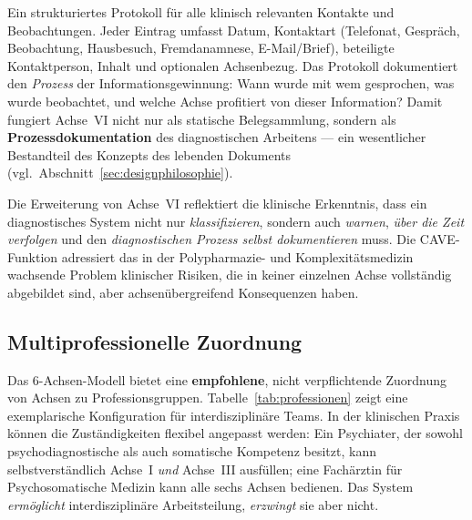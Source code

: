 \documentclass[11pt,a4paper]{article}
\begin{document}
\begin{description}[style=nextline, leftmargin=1.5cm, font=\bfseries]
\item[Kontakt- und Beobachtungsprotokoll] Ein strukturiertes Protokoll f\"ur alle klinisch relevanten Kontakte und Beobachtungen. Jeder Eintrag umfasst Datum, Kontaktart (Telefonat, Gespr\"ach, Beobachtung, Hausbesuch, Fremdanamnese, E-Mail/Brief), beteiligte Kontaktperson, Inhalt und optionalen Achsenbezug. Das Protokoll dokumentiert den \textit{Prozess} der Informationsgewinnung: Wann wurde mit wem gesprochen, was wurde beobachtet, und welche Achse profitiert von dieser Information? Damit fungiert Achse~VI nicht nur als statische Belegsammlung, sondern als \textbf{Prozessdokumentation} des diagnostischen Arbeitens --- ein wesentlicher Bestandteil des Konzepts des lebenden Dokuments (vgl.\ Abschnitt~\ref{sec:designphilosophie}).
\end{description}

Die Erweiterung von Achse~VI reflektiert die klinische Erkenntnis, dass ein diagnostisches System nicht nur \textit{klassifizieren}, sondern auch \textit{warnen}, \textit{\"uber die Zeit verfolgen} und den \textit{diagnostischen Prozess selbst dokumentieren} muss. Die CAVE-Funktion adressiert das in der Polypharmazie- und Komplexit\"atsmedizin wachsende Problem klinischer Risiken, die in keiner einzelnen Achse vollst\"andig abgebildet sind, aber achsen\"ubergreifend Konsequenzen haben.

\subsection{Multiprofessionelle Zuordnung}
\label{sec:multiprofessionell}

Das 6-Achsen-Modell bietet eine \textbf{empfohlene}, nicht verpflichtende Zuordnung von Achsen zu Professionsgruppen. Tabelle~\ref{tab:professionen} zeigt eine exemplarische Konfiguration f\"ur interdisziplin\"are Teams. In der klinischen Praxis k\"onnen die Zust\"andigkeiten flexibel angepasst werden: Ein Psychiater, der sowohl psychodiagnostische als auch somatische Kompetenz besitzt, kann selbstverst\"andlich Achse~I \textit{und} Achse~III ausf\"ullen; eine Fach\"arztin f\"ur Psychosomatische Medizin kann alle sechs Achsen bedienen. Das System \textit{erm\"oglicht} interdisziplin\"are Arbeitsteilung, \textit{erzwingt} sie aber nicht.
\end{document}
